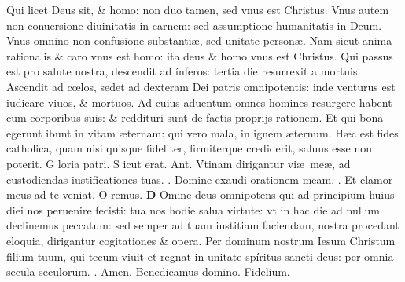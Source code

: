 \documentclass[a5paper,10pt]{book}
\def\ae{æ}
\def\oe{œ}
\begin{document}
\begin{multicols*}{2}
\newline \color{red} Q\color{black}ui licet Deus sit, \& homo: non duo tamen, sed vnus est Christus.
\newline \color{red} V\color{black}nus autem non conuersione diuinitatis in carnem: sed assumptione humanitatis in Deum.
\newline \color{red} V\color{black}nus omnino non confusione substanti\ae , sed unitate person\ae .
\newline \color{red} N\color{black}am sicut anima rationalis \& caro vnus est homo: ita deus \& homo vnus est Christus.
\newline \color{red} Q\color{black}ui passus est pro salute nostra, descendit ad ínferos: tertia die resurrexit a mortuis.
\newline \color{red} A\color{black}scendit ad c\oe los, sedet ad dexteram Dei patris omnipotentis: inde venturus est iudicare viuos, \& mortuos.
\newline \color{red} A\color{black}d cuius aduentum omnes homines resurgere habent cum corporibus suis: \& reddituri sunt de factis proprijs rationem.
\newline \color{red} E\color{black}t qui bona egerunt ibunt in vitam \ae ternam: qui vero mala, in ignem \ae ternum.
\newline \color{red} H\color{black}\ae c est fides catholica, quam nisi quisque fideliter, firmiterque crediderit, saluus esse non poterit. \color{red} G\color{black} loria patri. \color{red} S\color{black} icut erat.
\newline \color{red} Ant. \color{black} Vtinam dirigantur vi\ae \ me\ae , ad custodiendas iustificationes tuas.
\newline \color{red} \Vbar . \color{black} Domine exaudi orationem meam.
\newline \color{red} \Rbar . \color{black} Et clamor meus ad te veniat.
\newline \color{red} O\color{black} remus.
\lettrine[lines=2]{\bfseries \color{red} D}{}
Omine deus omnipotens qui ad principium huius diei nos peruenire fecisti: tua nos hodie salua virtute: vt in hac die ad nullum declinemus peccatum: sed semper ad tuam iustitiam faciendam, nostra procedant eloquia, dirigantur cogitationes \& opera. Per dominum nostrum Iesum Christum filium tuum, qui tecum viuit et regnat in unitate spíritus sancti deus: per omnia secula seculorum. \color{red} \Rbar . \color{black} Amen. Benedicamus domino. Fidelium.
\vspace{-1em}

\end{multicols*}
\end{document}
